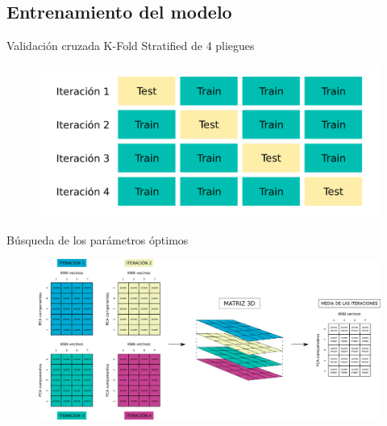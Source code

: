 \documentclass{beamer}
\begin{document}
\subsection{Entrenamiento del modelo}
\begin{frame}{Validación cruzada K-Fold Stratified de 4 pliegues}
\begin{figure}
    \begin{center}
        \includegraphics[width=12cm]{figs/KFold_explanation.png}
    \end{center}
\end{figure}
\end{frame}

\begin{frame}{Búsqueda de los parámetros óptimos}
    \begin{figure}
    \begin{center}
        \includegraphics[width=12cm]{figs/KFold_KNN_PCA.png}
    \end{center}
\end{figure}
\end{frame}
\end{document}
